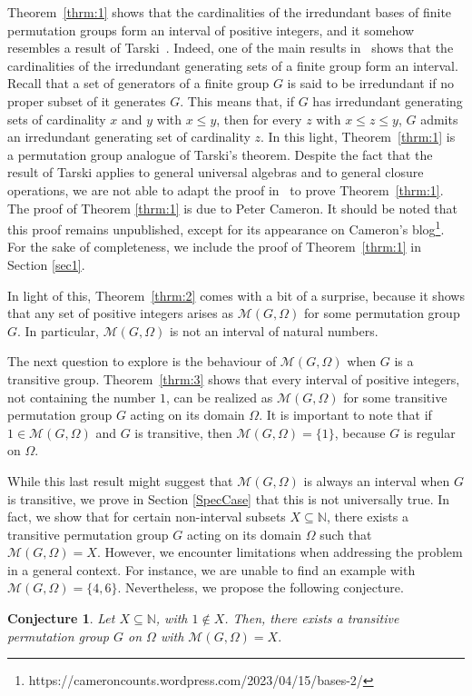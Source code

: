 \documentclass{amsart}
\newtheorem{conjecture}[theorem]{Conjecture}
\begin{document}
	Theorem~\ref{thrm:1} shows that the cardinalities of the irredundant bases of finite permutation groups form an interval of positive integers, and it somehow resembles a result of Tarski~\cite{Tarski}. Indeed, one of the main results in~\cite{Tarski} shows that the cardinalities of the irredundant generating sets of a finite group form an interval. Recall that a set of generators of a finite group $G$ is said to be irredundant if no proper subset of it generates $G$. This means that, if $G$ has irredundant generating sets of cardinality $x$ and $y$ with $x\le y$, then for every $z$ with $x\le z\le y$, $G$ admits an irredundant generating set of cardinality $z$. In this light, Theorem~\ref{thrm:1} is a permutation group analogue of Tarski's theorem. Despite the fact that the result of Tarski applies to general universal algebras and to general closure operations, we are not able to adapt the proof in~\cite{Tarski} to prove Theorem~\ref{thrm:1}.\\
	The proof of Theorem \ref{thrm:1} is due to Peter Cameron. It should be noted that this proof remains unpublished, except for its appearance on Cameron's blog\footnote{https://cameroncounts.wordpress.com/2023/04/15/bases-2/}. For the sake of completeness, we include the proof of Theorem~\ref{thrm:1} in Section \ref{sec1}.
	
	
	In light of this, Theorem~\ref{thrm:2} comes with a bit of a surprise, because it shows that any set of positive integers arises as $\mathcal{M}(G,\Omega)$ for some permutation group $G$. In particular, $\mathcal{M}(G,\Omega)$ is not an interval of natural numbers.
	
	The next question to explore is the behaviour of $\mathcal{M}(G,\Omega)$ when $G$ is a transitive group. Theorem~\ref{thrm:3} shows that every interval of positive integers, not containing the number $1$, can be realized as $\mathcal{M}(G,\Omega)$ for some transitive permutation group $G$ acting on its domain $\Omega$. It is important to note that if $1 \in \mathcal{M}(G,\Omega)$ and $G$ is transitive, then $\mathcal{M}(G,\Omega) = \{1\}$, because $G$ is regular on $\Omega$.	

	While this last result might suggest that $\mathcal{M}(G,\Omega)$ is always an interval when $G$ is transitive, we prove in Section \ref{SpecCase} that this is not universally true. In fact, we show that for certain non-interval subsets $X \subseteq \mathbb{N}$, there exists a transitive permutation group $G$ acting on its domain $\Omega$ such that $\mathcal{M}(G,\Omega) = X$. However, we encounter limitations when addressing the problem in a general context. For instance, we are unable to find an example with $\mathcal{M}(G,\Omega) = \{4,6\}$.	Nevertheless, we propose the following conjecture.
	\begin{conjecture}\label{conj1}
		Let $X \subseteq \mathbb{N}$, with $1 \notin X$. Then, there exists a transitive permutation group $G$ on $\Omega$ with $\mathcal{M}(G,\Omega) = X.$
	\end{conjecture}
\end{document}

